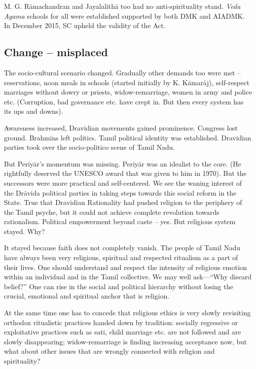 M. G. Rāmachandran and Jayalalithā too had no anti-spirituality stand. \textit{Veda Agama} schools for all were established supported by both DMK and AIADMK. In December 2015, SC upheld the validity of the Act.


\subsection*{Change – misplaced}

\vskip -7pt

The socio-cultural scenario changed. Gradually other demands too were met – reservations, noon meals in schools (started initially by K. Kāmarāj), self-respect marriages without dowry or priests, widow-remarriage, women in army and police etc. (Corruption, bad governance etc. have crept in. But then every system has its ups and downs).

Awareness increased, Dravidian movements gained prominence. Congress lost ground. Brahmins left politics. Tamil political identity was established. Dravidian parties took over the socio-politico scene of Tamil Nadu.

But Periyār’s momentum was missing. Periyār was an idealist to the core. (He rightfully deserved the UNESCO award that was given to him in 1970). But the successors were more practical and self-centered. We see the waning interest of the Drāvida political parties in taking steps towards this social reform in the State. True that Dravidian Rationality had pushed religion to the periphery of the Tamil psyche, but it could not achieve complete revolution towards rationalism. Political empowerment beyond caste – yes. But religious system stayed. Why?

It stayed because faith does not completely vanish. The people of Tamil Nadu have always been very religious, spiritual and respected ritualism as a part of their lives. One should understand and respect the intensity of religious emotion within an individual and in the Tamil collective. We may well ask—“Why discard belief?” One can rise in the social and political hierarchy without losing the crucial, emotional and spiritual anchor that is religion.

At the same time one has to concede that religious ethics is very slowly revisiting orthodox ritualistic practices handed down by tradition: socially regressive or exploitative practices such as sati, child marriage etc. are not followed and are slowly disappearing; widow-remarriage is finding increasing acceptance now, but what about other issues that are wrongly connected with religion and spirituality?


